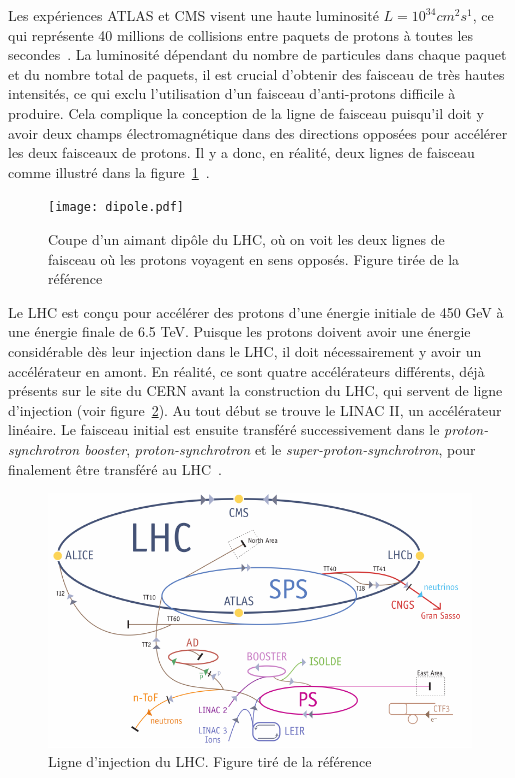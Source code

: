Les expériences ATLAS et CMS visent une haute luminosité
$L = 10^{34} cm^2 s^1$, ce qui représente 40 millions de collisions
entre paquets de protons à toutes les
secondes~\cite{collaboration_atlas_2008}. La luminosité dépendant du
nombre de particules dans chaque paquet et du nombre total de
paquets, il est crucial d'obtenir des faisceau de très hautes
intensités, ce qui exclu l'utilisation d'un faisceau d'anti-protons
difficile à produire. Cela complique la conception de la ligne
de faisceau puisqu'il doit y avoir deux champs électromagnétique dans
des directions opposées pour accélérer les deux faisceaux de
protons. Il y a donc, en réalité, deux lignes de faisceau comme
illustré dans la figure~\ref{fig:dipole}~\cite{evans_lhc_2008}.

\begin{figure}[h!]
  \centering
  \texttt{[image: dipole.pdf]}
  \caption{Coupe d'un aimant dipôle du LHC, où on voit les deux lignes
    de faisceau où les protons voyagent en sens opposés. Figure tirée
    de la référence~\cite{evans_lhc_2008}}
\label{fig:dipole}
\end{figure}

Le LHC est conçu pour accélérer des protons d'une énergie initiale de
450 GeV à une énergie finale de 6.5 TeV. Puisque les protons doivent
avoir une énergie considérable dès leur injection dans le LHC, il doit
nécessairement y avoir un accélérateur en amont. En réalité, ce sont
quatre accélérateurs différents, déjà présents sur le site du CERN
avant la construction du LHC, qui servent de ligne d'injection (voir
figure~\ref{fig:lhc_injection}). Au tout début se trouve le LINAC II,
un accélérateur linéaire. Le faisceau initial est ensuite transféré
successivement dans le \emph{proton-synchrotron booster},
\emph{proton-synchrotron} et le \emph{super-proton-synchrotron}, pour
finalement être transféré au LHC~\cite{evans_lhc_2008}.

\begin{figure}
  \centering
  \includegraphics[width=.5\textwidth]{lhc_injection.pdf}
  \caption{Ligne d'injection du LHC. Figure tiré de la
    référence~\cite{Lefevre:1165534}}
  \label{fig:lhc_injection}
\end{figure}

